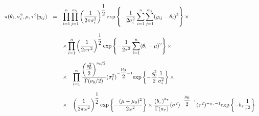 \documentclass[a4paper, 11pt]{article}
\begin{document}
\begin{equation*}
\begin{array}{lcl ll }

\pi(\theta_i, \sigma_i^2, \mu, \tau^2 |y_{ij}) & = & \displaystyle\prod_{i=1}^{n}\displaystyle\prod_{j=1}^{m_i}\left(\dfrac{1}{2\pi\sigma_i^2}\right)^{\dfrac{1}{2}}\mbox{exp}\left\{ - \dfrac{1}{2\sigma_i^2}\displaystyle\sum_{i=1}^{n}\displaystyle\sum_{j=1}^{m_i}(y_{ij} - \theta_i)^2\right\} \times \\ \\

& & \times \displaystyle\prod_{i=1}^{n}\left(\dfrac{1}{2\pi\tau^2}\right)^{\dfrac{1}{2}}\mbox{exp}\left\{ - \dfrac{1}{2\tau^2} 
\displaystyle\sum_{i=1}^{n} (\theta_i - \mu)^2\right\} \times \\ \\

& & \times \hspace{0.3cm} \displaystyle\prod_{i=1}^{n}\dfrac{\left(\dfrac{s_0^2}{2}\right)^{\nu_0/2}}{\Gamma(\nu_0/2)}(\sigma_i^2)^{-\dfrac{\nu_0}{2}-1} \mbox{exp}\left\{ - \dfrac{s_0^2}{2}\dfrac{1}{\sigma_i^2}\right\} \times \\ \\

& & \times \hspace{0.3cm}\left(\dfrac{1}{2\pi\omega^2}\right)^{\dfrac{1}{2}}\mbox{exp}\left\{ - \dfrac{(\mu - \mu_0)^2}{2\omega^2}\right\} \times\dfrac{\left(b_\tau\right)^{a_\tau}}{\Gamma(a_\tau)}(\sigma^2)^{-\dfrac{\nu_0}{2}-1} (\tau^2)^{-a_\tau-1} \mbox{exp}\left\{ - b_\tau\dfrac{1}{\tau^2}\right\} \\ \\


 \end{array}
\end{equation*}
\end{document}
